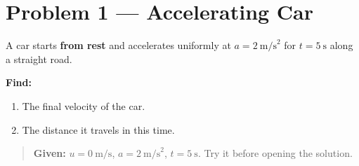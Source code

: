 
\section*{Problem 1 --- Accelerating Car}

A car starts \textbf{from rest} and accelerates uniformly at
$a = 2\ \text{m/s}^{2}$ for $t = 5\ \text{s}$ along a straight road.

\textbf{Find:}
\begin{enumerate}
  \item The final velocity of the car.
  \item The distance it travels in this time.
\end{enumerate}

\begin{quote}
\textbf{Given:} $u = 0\ \text{m/s}$, $a = 2\ \text{m/s}^{2}$,
$t = 5\ \text{s}$. Try it before opening the solution.
\end{quote}
